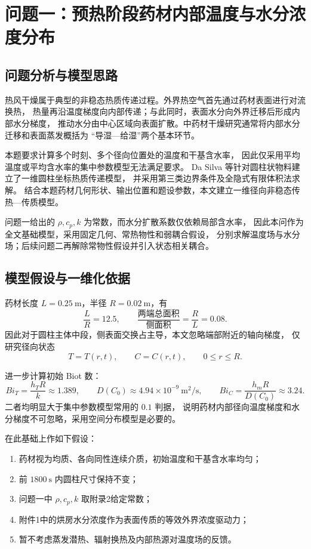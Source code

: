 \documentclass[UTF8,a4paper,11pt]{ctexart}
\begin{document}
\section{问题一：预热阶段药材内部温度与水分浓度分布}

\subsection{问题分析与模型思路}

热风干燥属于典型的非稳态热质传递过程。外界热空气首先通过药材表面进行对流换热，
热量再沿温度梯度向内部传递；与此同时，表面水分向外界迁移后形成内部水分梯度，
推动水分由中心区域向表面扩散。中药材干燥研究通常将内部水分迁移和表面蒸发概括为
“导湿—给湿”两个基本环节\cite{wang2024}。

本题要求计算多个时刻、多个径向位置处的温度和干基含水率，
因此仅采用平均温度或平均含水率的集中参数模型无法满足要求。
Da Silva 等针对圆柱状物料建立了一维圆柱坐标热质传递模型，
并采用第三类边界条件及全隐式有限体积法求解\cite{dasilva2014}。
结合本题药材几何形状、输出位置和题设参数，本文建立一维径向非稳态传热—传质模型。

问题一给出的 $\rho,c_p,k$ 为常数，而水分扩散系数仅依赖局部含水率，
因此本问作为全文基础模型，采用固定几何、常热物性和弱耦合假设，
分别求解温度场与水分场；后续问题二再解除常物性假设并引入状态相关耦合。

\subsection{模型假设与一维化依据}

药材长度 $L=0.25~\mathrm m$，半径 $R=0.02~\mathrm m$，有
\[
\frac{L}{R}=12.5,
\qquad
\frac{\text{两端总面积}}{\text{侧面积}}
=\frac{R}{L}=0.08.
\]
因此对于圆柱主体中段，侧表面交换占主导，本文忽略端部附近的轴向梯度，
仅研究径向状态
\[
T=T(r,t),\qquad C=C(r,t),\qquad 0\le r\le R.
\]

进一步计算初始 Biot 数：
\[
Bi_T=\frac{h_TR}{k}\approx1.389,
\qquad
D(C_0)\approx4.94\times10^{-9}\ \mathrm{m^2/s},
\qquad
Bi_C=\frac{h_mR}{D(C_0)}\approx3.24.
\]
二者均明显大于集中参数模型常用的 $0.1$ 判据，
说明药材内部径向温度梯度和水分梯度不可忽略，采用空间分布模型是必要的。

在此基础上作如下假设：

\begin{enumerate}
    \item 药材视为均质、各向同性连续介质，初始温度和干基含水率均匀；
    \item 前 $1800~\mathrm s$ 内圆柱尺寸保持不变；
    \item 问题一中 $\rho,c_p,k$ 取附录2给定常数；
    \item 附件1中的烘房水分浓度作为表面传质的等效外界浓度驱动力；
    \item 暂不考虑蒸发潜热、辐射换热及内部热源对温度场的反馈。
\end{enumerate}
\end{document}
